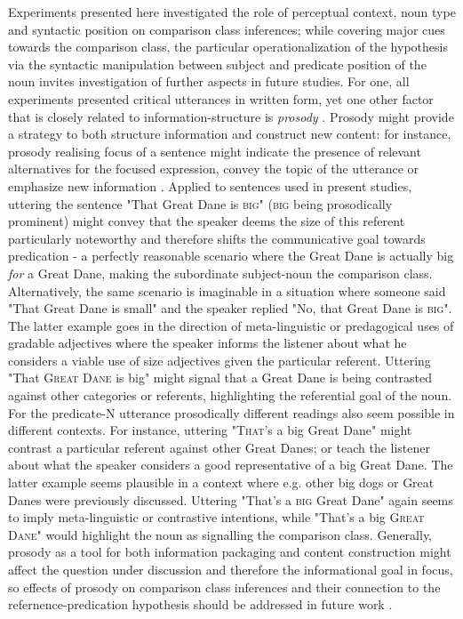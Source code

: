 Experiments presented here investigated the role of perceptual context, noun type and syntactic position on comparison class inferences; while covering major cues towards the comparison class, the particular operationalization of the hypothesis via the syntactic manipulation between subject and predicate position of the noun invites investigation of further aspects in future studies. For one, all experiments presented critical utterances in written form, yet one other factor that is closely related to information-structure is \emph{prosody} \parencite{krifka2008basic}. Prosody might provide a strategy to both structure information and construct new content: for instance, prosody realising focus of a sentence might indicate the presence of relevant alternatives for the focused expression, convey the topic of the utterance or emphasize new information \parencite{krifka2008basic, selkirk1995sentence}. 
Applied to sentences used in present studies, uttering the sentence "That Great Dane is \textsc{big}" (\textsc{big} being prosodically prominent) might convey that the speaker deems the size of this referent particularly noteworthy and therefore shifts the communicative goal towards predication - a perfectly reasonable scenario where the Great Dane is actually big \emph{for} a Great Dane, making the subordinate subject-noun the comparison class.  Alternatively, the same scenario is imaginable in a situation where someone said "That Great Dane is small" and the speaker replied "No, that Great Dane is \textsc{big}". The latter example goes in the direction of meta-linguistic or predagogical uses of gradable adjectives where the speaker informs the listener about what he considers a viable use of size adjectives given the particular referent. Uttering "That \textsc{Great Dane} is big" might signal that a Great Dane is being contrasted against other categories or referents, highlighting the referential goal of the noun.
For the predicate-N utterance prosodically different readings also seem possible in different contexts. For instance, uttering "\textsc{That}'s a big Great Dane" might contrast a particular referent against other Great Danes; or teach the listener about what the speaker considers a good representative of a big Great Dane. The latter example seems plausible in a context where e.g. other big dogs or Great Danes were previously discussed. Uttering "That's a \textsc{big} Great Dane" again seems to imply meta-linguistic or contrastive intentions, while "That's a big \textsc{Great Dane}" would highlight the noun as signalling the comparison class. 
Generally, prosody as a tool for both information packaging and content construction might affect the question under discussion and therefore the informational goal in focus, so effects of prosody on comparison class inferences and their connection to the refernence-predication hypothesis should be addressed in future work \parencite[cf.][]{krifka2008basic}. 

